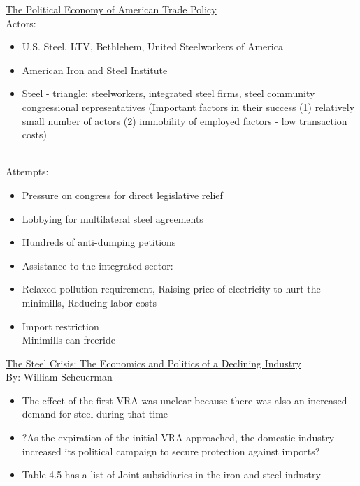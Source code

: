 \documentclass[10pt]{article}
\begin{document}
\begin{itemize}
\normalsize\underline{The Political Economy of American Trade Policy}\\
\normalsize Actors:\\
\begin{itemize}
  \item U.S. Steel, LTV, Bethlehem, United Steelworkers of America\\
  \item American Iron and Steel Institute\\
  \item Steel - triangle: steelworkers, integrated steel firms, steel community congressional representatives (Important factors in their success (1) relatively small number of actors (2) immobility of employed factors - low transaction costs)\\
\end{itemize}\\
\normalsize Attempts:\\
\begin{itemize}
  \item Pressure on congress for direct legislative relief\\ 
  \item Lobbying for multilateral steel agreements\\ 
  \item Hundreds of anti-dumping petitions\\ 
  \item Assistance to the integrated sector:\\
  \item Relaxed pollution requirement, Raising price of electricity to hurt the minimills, Reducing labor costs\\
  \item Import restriction\\ 
        Minimills can freeride\\
\end{itemize}
\normalsize\underline{The Steel Crisis: The Economics and Politics of a Declining Industry}\\
\normalsize By: William Scheuerman
\begin{itemize}
  \item The effect of the first VRA was unclear because there was also an increased demand for steel during that time
  \item ?As the expiration of the initial VRA approached, the domestic industry increased its political campaign to secure protection against imports?
  \item Table 4.5 has a list of Joint subsidiaries in the iron and steel industry

\end{itemize}
\end{itemize}
\end{document}
